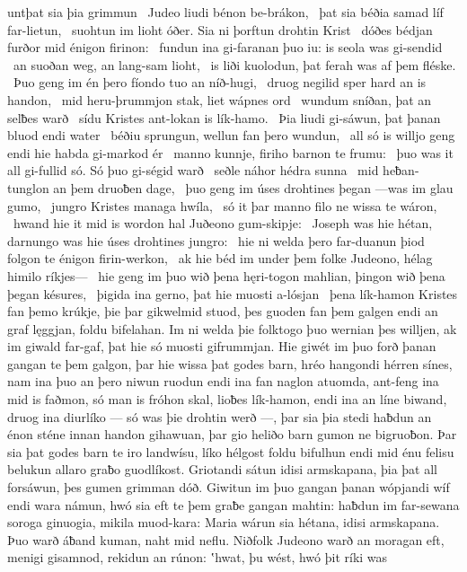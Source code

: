 untþat sia þia grimmun \hld\ Judeo liudi
bénon be-brákon, \hld\ þat sia béðia samad
líf far-lietun, \hld\ suohtun im lioht óðer.
Sia ni þorftun drohtin Krist \hld\ dóðes bédjan
furðor mid énigon firinon: \hld\ fundun ina gi-faranan þuo iu:
is seola was gi-sendid \hld\ an suoðan weg,
an lang-sam lioht, \hld\ is liði kuolodun,
þat ferah was af þem fléske. \hld\ Þuo geng im én þero fíondo tuo
an níð-hugi, \hld\ druog negilid sper
hard an is handon, \hld\ mid heru-þrummjon stak,
liet wápnes ord \hld\ wundum sníðan,
þat an selƀes warð \hld\ sídu Kristes
ant-lokan is lík-hamo. \hld\ Þia liudi gi-sáwun,
þat þanan bluod endi water \hld\ béðiu sprungun,
wellun fan þero wundun, \hld\ all só is willjo geng
endi hie habda gi-markod ér \hld\ manno kunnje,
firiho barnon te frumu: \hld\ þuo was it all gi-fullid só.
Só þuo gi-ségid warð \hld\ seðle náhor
hédra sunna \hld\ mid heƀan-tunglon
an þem druoƀen dage, \hld\ þuo geng im úses drohtines þegan
—was im glau gumo, \hld\ jungro Kristes
managa hwíla, \hld\ só it þar manno filo
ne wissa te wáron, \hld\ hwand hie it mid is wordon hal
Juðeono gum-skipje: \hld\ Joseph was hie hétan,
darnungo was hie úses drohtines jungro: \hld\ hie ni welda þero far-duanun þiod
folgon te énigon firin-werkon, \hld\ ak hie béd im under þem folke Judeono,
hélag himilo ríkjes— \hld\ hie geng im þuo wið þena hęri-togon mahlian,
þingon wið þena þegan késures, \hld\ þigida ina gerno,
þat hie muosti a-lósjan \hld\ þena lík-hamon
Kristes fan þemo krúkje, þie þar gikwelmid stuod,
þes guoden fan þem galgen endi an graf lęggjan,
foldu bifelahan. Im ni welda þie folktogo þuo
wernian þes willjen, ak im giwald far-gaf,
þat hie só muosti gifrummjan. Hie giwét im þuo forð þanan
gangan te þem galgon, þar hie wissa þat godes barn,
hréo hangondi hérren sínes,
nam ina þuo an þero niwun ruodun endi ina fan naglon atuomda,
ant-feng ina mid is faðmon, só man is fróhon skal,
lioƀes lík-hamon, endi ina an líne biwand,
druog ina diurlíko — só was þie drohtin werð —,
þar sia þia stedi haƀdun an énon sténe innan
handon gihawuan, þar gio heliðo barn
gumon ne bigruoƀon. Þar sia þat godes barn
te iro landwísu, líko hélgost
foldu bifulhun endi mid énu felisu belukun
allaro graƀo guodlíkost. Griotandi sátun
idisi armskapana, þia þat all forsáwun,
þes gumen grimman dóð. Giwitun im þuo gangan þanan
wópjandi wíf endi wara námun,
hwó sia eft te þem graƀe gangan mahtin:
haƀdun im far-sewana soroga ginuogia,
mikila muod-kara: Maria wárun sia hétana,
idisi armskapana. Þuo warð áƀand kuman,
naht mid neflu. Niðfolk Judeono
warð an moragan eft, menigi gisamnod,
rekidun an rúnon: ʽhwat, þu wést, hwó þit ríki was

